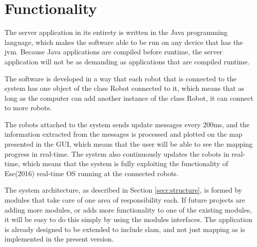 \section{Functionality}
The server application in its entirety is written in the Java programming language, which makes the software able to be run on any device that has the \acrlong{jvm}. Because Java applications are compiled before runtime, the server application will not be as demanding as applications that are compiled runtime. 

The software is developed in a way that each robot that is connected to the system has one object of the class Robot connected to it, which means that as long as the computer can add another instance of the class Robot, it can connect to more robots. 

The robots attached to the system sends update messages every 200ms, and the information extracted from the messages is processed and plotted on the map presented in the GUI, which means that the user will be able to see the mapping progress in real-time. The system also continuously updates the robots in real-time, which means that the system is fully exploiting the functionality of Ese(2016) real-time OS running at the connected robots.

The system architecture, as described in Section \ref{secr:structure}, is formed by modules that take care of one area of responsibility each. If future projects are adding more modules, or adds more functionality to one of the existing modules, it will be easy to do this simply by using the modules interfaces. The application is already designed to be extended to include \acrfull{slam}, and not just mapping as is implemented in the present version.